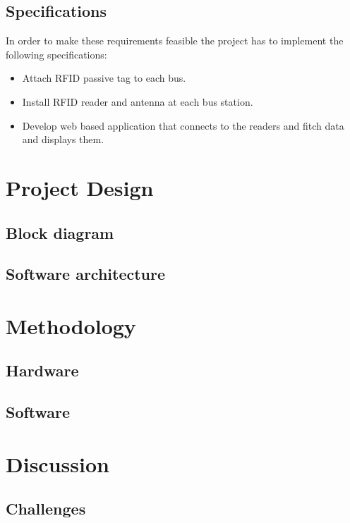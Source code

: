 \documentclass[a4paper,twoside]{article}
\begin{document}
\subsection{Specifications}
In order to make these requirements feasible the project has to implement the following specifications:
\begin{itemize}
\item 
Attach RFID passive tag to each bus.
\item
Install RFID reader and antenna at each bus station.
\item
Develop web based application that connects to the readers and fitch data and displays them.
\end{itemize}
%

\section{Project Design}

\subsection{Block diagram}

\subsection{Software architecture}



\section{Methodology}

\subsection{Hardware}

\subsection{Software}



\section{Discussion}

\subsection{Challenges}
\end{document}

